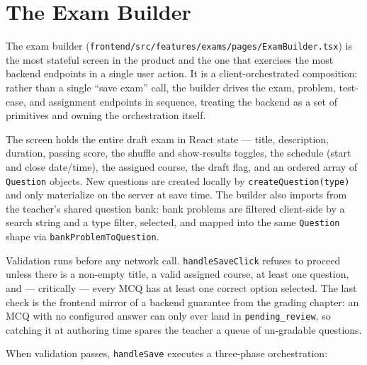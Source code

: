 \section{The Exam Builder}

The exam builder (\texttt{frontend/src/features/exams/pages/ExamBuilder.tsx})
is the most stateful screen in the product and the one that exercises the most
backend endpoints in a single user action. It is a client-orchestrated
composition: rather than a single ``save exam'' call, the builder drives the
exam, problem, test-case, and assignment endpoints in sequence, treating the
backend as a set of primitives and owning the orchestration itself.

The screen holds the entire draft exam in React state --- title, description,
duration, passing score, the shuffle and show-results toggles, the schedule
(start and close date/time), the assigned course, the draft flag, and an
ordered array of \texttt{Question} objects. New questions are created locally by
\texttt{createQuestion(type)} and only materialize on the server at save time.
The builder also imports from the teacher's shared question bank: bank problems
are filtered client-side by a search string and a type filter, selected, and
mapped into the same \texttt{Question} shape via \texttt{bankProblemToQuestion}.

Validation runs before any network call. \texttt{handleSaveClick} refuses to
proceed unless there is a non-empty title, a valid assigned course, at least one
question, and --- critically --- every MCQ has at least one correct option
selected. The last check is the frontend mirror of a backend guarantee from the
grading chapter: an MCQ with no configured answer can only ever land in
\texttt{pending\_review}, so catching it at authoring time spares the teacher a
queue of un-gradable questions.

When validation passes, \texttt{handleSave} executes a three-phase orchestration:


